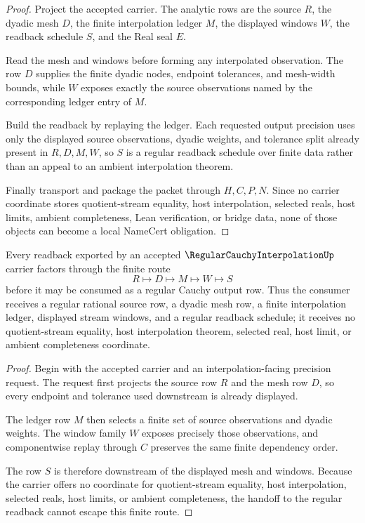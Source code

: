 \begin{proof}
Project the accepted carrier. The analytic rows are the source $R$, the dyadic mesh $D$, the finite interpolation ledger $M$, the displayed windows $W$, the readback schedule $S$, and the Real seal $E$.

Read the mesh and windows before forming any interpolated observation. The row $D$ supplies the finite dyadic nodes, endpoint tolerances, and mesh-width bounds, while $W$ exposes exactly the source observations named by the corresponding ledger entry of $M$.

Build the readback by replaying the ledger. Each requested output precision uses only the displayed source observations, dyadic weights, and tolerance split already present in $R,D,M,W$, so $S$ is a regular readback schedule over finite data rather than an appeal to an ambient interpolation theorem.

Finally transport and package the packet through $H,C,P,N$. Since no carrier coordinate stores quotient-stream equality, host interpolation, selected reals, host limits, ambient completeness, Lean verification, or bridge data, none of those objects can become a local NameCert obligation.
\end{proof}

\begin{theorem}
\label{thm:regular-cauchy-interpolation-dyadic-window-handoff}
Every readback exported by an accepted $\RegularCauchyInterpolationUp$ carrier factors through the finite route
$$
R\longmapsto D\longmapsto M\longmapsto W\longmapsto S
$$
before it may be consumed as a regular Cauchy output row. Thus the consumer receives a regular rational source row, a dyadic mesh row, a finite interpolation ledger, displayed stream windows, and a regular readback schedule; it receives no quotient-stream equality, host interpolation theorem, selected real, host limit, or ambient completeness coordinate.
\end{theorem}
\begin{proof}
Begin with the accepted carrier and an interpolation-facing precision request. The request first projects the source row $R$ and the mesh row $D$, so every endpoint and tolerance used downstream is already displayed.

The ledger row $M$ then selects a finite set of source observations and dyadic weights. The window family $W$ exposes precisely those observations, and componentwise replay through $C$ preserves the same finite dependency order.

The row $S$ is therefore downstream of the displayed mesh and windows. Because the carrier offers no coordinate for quotient-stream equality, host interpolation, selected reals, host limits, or ambient completeness, the handoff to the regular readback cannot escape this finite route.
\end{proof}

